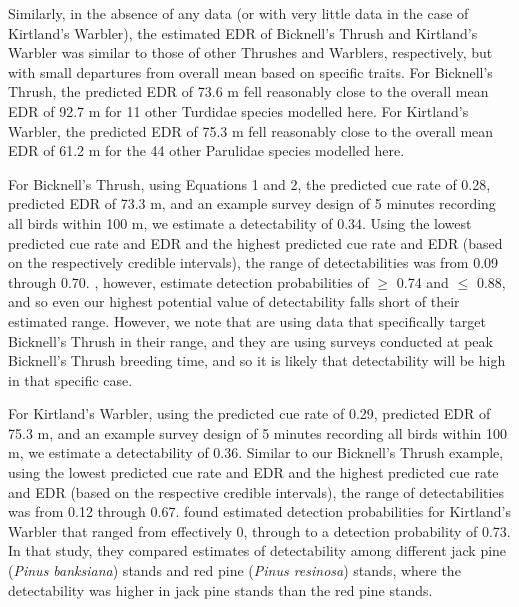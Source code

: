 \documentclass[12pt]{article}
\begin{document}
\par Similarly, in the absence of any data (or with very little data in the case of Kirtland’s Warbler), the estimated EDR of Bicknell’s Thrush and Kirtland’s Warbler was similar to those of other Thrushes and Warblers, respectively, but with small departures from overall mean based on specific traits.
For Bicknell's Thrush, the predicted EDR of 73.6 m fell reasonably close to the overall mean EDR of 92.7 m for 11 other Turdidae species modelled here.
For Kirtland's Warbler, the predicted EDR of 75.3 m fell reasonably close to the overall mean EDR of 61.2 m for the 44 other Parulidae species modelled here.

\par For Bicknell's Thrush, using Equations 1 and 2, the predicted cue rate of 0.28, predicted EDR of 73.3 m, and an example survey design of 5 minutes recording all birds within 100 m, we estimate a detectability of 0.34.
Using the lowest predicted cue rate and EDR and the highest predicted cue rate and EDR (based on the respectively credible intervals), the range of detectabilities was from 0.09 through 0.70.
\citet{aubry_bicknells_2018}, however, estimate detection probabilities of $\geq$ 0.74 and $\leq$ 0.88, and so even our highest potential value of detectability falls short of their estimated range.
However, we note that \citet{aubry_bicknells_2018} are using data that specifically target Bicknell's Thrush in their range, and they are using surveys conducted at peak Bicknell's Thrush breeding time, and so it is likely that detectability will be high in that specific case.

\par For Kirtland’s Warbler, using the predicted cue rate of 0.29, predicted EDR of 75.3 m, and an example survey design of 5 minutes recording all birds within 100 m, we estimate a detectability of 0.36.
Similar to our Bicknell’s Thrush example, using the lowest predicted cue rate and EDR and the highest predicted cue rate and EDR (based on the respective credible intervals), the range of detectabilities was from 0.12 through 0.67.
\citet{van_dyke_comparative_2022} found estimated detection probabilities for Kirtland’s Warbler that ranged from effectively 0, through to a detection probability of 0.73.
In that study, they compared estimates of detectability among different jack pine (\textit{Pinus banksiana}) stands and red pine (\textit{Pinus resinosa}) stands, where the detectability was higher in jack pine stands than the red pine stands.
\end{document}
